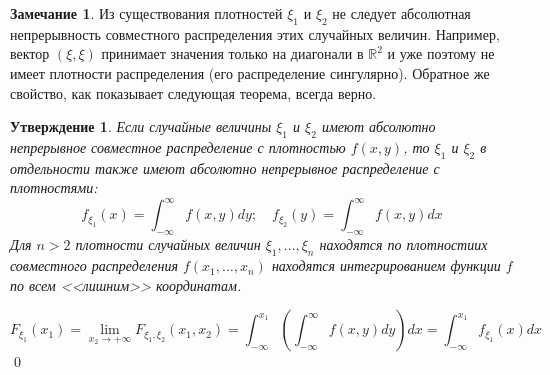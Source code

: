 \documentclass[oneside,final,14pt]{extreport}
\renewenvironment{proof}{{\bfseries Доказательство.}}{\qed}
\theoremstyle{plain}
\newtheorem*{thm*}{Утверждение}
\theoremstyle{definition}
\newtheorem*{rmrk}{Замечание}
\theoremstyle{named}
\begin{document}
\begin{rmrk}
    Из существования плотностей $\xi_1$ и $\xi_2$ не следует абсолютная непрерывность совместного распределения этих случайных величин. Например, вектор $(\xi, \xi)$ принимает значения только на диагонали в $\mathbb{R}^2$ и уже поэтому не имеет плотности распределения (его распределение сингулярно). Обратное же свойство, как показывает следующая теорема, всегда верно.
\end{rmrk}

\begin{thm*}
    Если случайные величины $\xi_1$ и $\xi_2$ имеют абсолютно непрерывное совместное распределение с плотностью $f(x, y)$, то $\xi_1$ и $\xi_2$ в отдельности также имеют абсолютно непрерывное распределение с плотностями:
    \begin{equation*}
        f_{\xi_{1}}(x)=\int_{-\infty}^{\infty} f(x, y) d y ; \quad f_{\xi_{2}}(y)=\int_{-\infty}^{\infty} f(x, y) d x
    \end{equation*}
    Для $n > 2$ плотности случайных величин $\xi_1, \ldots, \xi_n$ находятся по плотностиих совместного распределения $f(x_1, \ldots, x_n)$ находятся интегрированием функции $f$ по всем <<лишним>> координатам.
\end{thm*}
\begin{proof}
\begin{equation*}
    F_{\xi_{1}}\left(x_{1}\right)
    = \lim _{x_{2} \rightarrow+\infty} F_{\xi_{1}, \xi_{2}}\left(x_{1}, x_{2}\right)
    = 
    \boxed{\int_{-\infty}^{x_{1}}\left(\int_{-\infty}^{\infty} f(x, y) d y\right) d x
    = \int_{-\infty}^{x_{1}} f_{\xi_{1}}(x) d x}
\end{equation*}
\end{proof}
\end{document}
